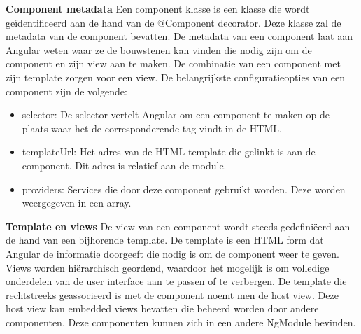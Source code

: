 \textbf{Component metadata} \hspace{1cm} Een component klasse is een klasse die wordt geïdentificeerd aan de hand van de @Component decorator. Deze klasse zal de metadata van de component bevatten. De metadata van een component laat aan Angular weten waar ze de bouwstenen kan vinden die nodig zijn om de component en zijn view aan te maken. De combinatie van een component met zijn template zorgen voor een view. 
De belangrijkste configuratieopties van een component zijn de volgende:
\begin{itemize}
	\item selector: De selector vertelt Angular om een component te maken op de plaats waar het de corresponderende tag vindt in de HTML. 
	\item templateUrl: Het adres van de HTML template die gelinkt is aan de component. Dit adres is relatief aan de module. 
	\item providers: Services die door deze component gebruikt worden. Deze worden weergegeven in een array. 
\end{itemize}

\textbf{Template en views} \hspace{1cm} De view van een component wordt steeds gedefiniëerd aan de hand van een bijhorende template. De template is een HTML form dat Angular de informatie doorgeeft die nodig is om de component weer te geven. Views worden hiërarchisch geordend, waardoor het mogelijk is om volledige onderdelen van de user interface aan te passen of te verbergen. De template die rechtstreeks geassocieerd is met de component noemt men de host view. Deze host view kan embedded views bevatten die beheerd worden door andere componenten. Deze componenten kunnen zich in een andere NgModule bevinden. 

